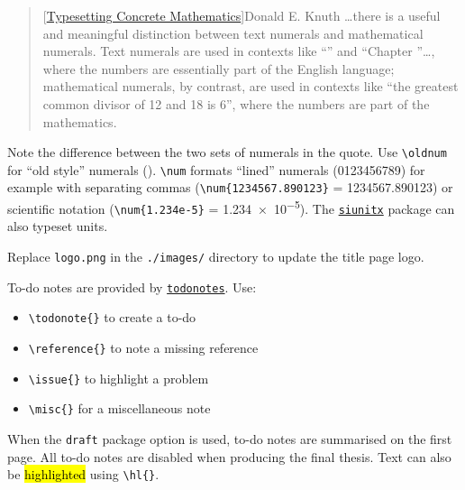 \begin{quote}[\href{https://www.tug.org/TUGboat/Articles/tb10-1/tb23knut.pdf}{Typesetting Concrete Mathematics}]{Donald E. Knuth}
  \dots there is a useful and meaningful distinction between text numerals and mathematical
  numerals. Text numerals are used in contexts like ``'' and ``Chapter ''\dots,
  where the numbers are essentially part of the English language; mathematical numerals, by contrast,
  are used in contexts like ``the greatest common divisor of 12 and 18 is 6'', where the numbers
  are part of the mathematics.
\end{quote}


Note the difference between the two sets of numerals in the quote. Use \verb|\oldnum| for
``old style'' numerals (). \verb|\num| formats ``lined'' numerals (0123456789)
for example with separating commas (\verb|\num{1234567.890123}| = \num{1234567.890123}) or 
scientific notation (\verb|\num{1.234e-5}| = \num{1.234e-5}). The \href{https://ctan.org/pkg/siunitx}{\texttt{siunitx}}
package can also typeset units.


Replace \texttt{logo.png} in the \texttt{./images/} directory to update the title page logo.

\label{sec:todonotes}

To-do notes are provided by \href{https://ctan.org/pkg/todonotes}{\texttt{todonotes}}. Use:
\begin{itemize}
  \item \verb|\todonote{}| to create a to-do
  \item \verb|\reference{}| to note a missing reference
  \item \verb|\issue{}| to highlight a problem
  \item \verb|\misc{}| for a miscellaneous note
\end{itemize}

When the \texttt{draft} package option is used, to-do notes are summarised on the first
page. All to-do notes are disabled when producing the final thesis. Text can also be \hl{highlighted} using \verb|\hl{}|. 


